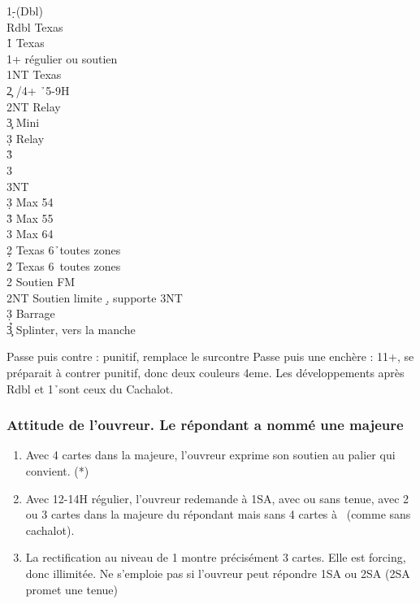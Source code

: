 \documentclass[a4paper]{article}
\begin{document}
\begin{bidtable}
1\d-(Dbl)\\
Rdbl \> Texas \h \\
1\h \> Texas \s \\
1\s {}+ régulier ou soutien \d \\
1NT \> Texas \c \\
2\c {} \s /4+ \h\ 5-9H\+\\
2NT \> Relay\+\\
3\c \> Mini\+\\
3\d \> Relay\+\\
3\h {}\\
3\s {}\\
3NT \-\-\\
3\d \> Max 54\\
3\h \> Max 55\\
3\s \> Max 64\-\-\\
2\d \> Texas 6\h\ toutes zones\\
2\h \> Texas 6\s\ toutes zones\\
2\s \> Soutien FM \d \\
2NT \> Soutien limite \d , supporte 3NT\\
3\d \> Barrage \d \\
3\c\h\s \> Splinter, vers la manche
\end{bidtable}

Passe puis contre : punitif, remplace le surcontre
Passe puis une enchère : 11+, se préparait à contrer punitif, donc deux couleurs 4eme.
Les développements après Rdbl et 1\h\ sont ceux du Cachalot.

\subsubsection{Attitude de l’ouvreur. Le répondant a 
nommé une majeure}

\begin{enumerate}
\item Avec 4 cartes dans la majeure, l’ouvreur exprime son soutien 
au palier qui convient. (*)

\item Avec 12-14H régulier, l’ouvreur redemande à 1SA, avec ou 
sans tenue, avec 2 ou 3 cartes dans la majeure du répondant 
mais sans 4 cartes à \s\ (comme sans cachalot).

\item La rectification au niveau de 1 montre précisément 3 cartes. 
Elle est forcing, donc illimitée. Ne s’emploie pas si l’ouvreur 
peut répondre 1SA ou 2SA (2SA promet une tenue)

\end{enumerate}
\end{document}
